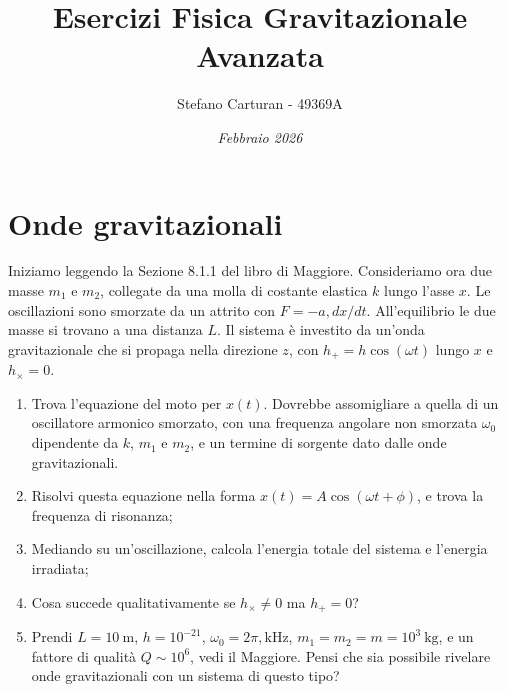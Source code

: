 \documentclass[a4paper,10pt]{article}
\begin{document}
\title{\textbf{Esercizi Fisica Gravitazionale Avanzata}}
\author{Stefano Carturan - 49369A}
\date{\textit{Febbraio 2026}}
\maketitle

\tableofcontents

\newpage

\section{Onde gravitazionali}

Iniziamo leggendo la Sezione 8.1.1 del libro di Maggiore.
Consideriamo ora due masse $m_1$ e $m_2$, collegate da una molla di costante elastica $k$ lungo l’asse $x$.
Le oscillazioni sono smorzate da un attrito con $F = -a , dx/dt$. All’equilibrio le due masse si trovano a una distanza $L$.
Il sistema è investito da un’onda gravitazionale che si propaga nella direzione $z$, con
$h_{+} = h \cos(\omega t)$ lungo $x$ e $h_{\times} = 0$.

\begin{enumerate}

    \item Trova l’equazione del moto per $x(t)$. Dovrebbe assomigliare a quella di un oscillatore armonico smorzato, con una frequenza angolare non smorzata $\omega_0$ dipendente da $k$, $m_1$ e $m_2$, e un termine di sorgente dato dalle onde gravitazionali.
    
    \item Risolvi questa equazione nella forma $x(t) = A \cos(\omega t + \phi)$, e trova la frequenza di risonanza;
    
    \item Mediando su un’oscillazione, calcola l’energia totale del sistema e l’energia irradiata;
    
    \item Cosa succede qualitativamente se $h_{\times} \neq 0$ ma $h_{+} = 0$?

    \item Prendi $L = 10 \ \mathrm{m}$, $h = 10^{-21}$, $\omega_0 = 2\pi,\mathrm{kHz}$, $m_1 = m_2 = m = 10^3 \ \mathrm{kg}$, e un fattore di qualità $Q \sim 10^6$, vedi il Maggiore.
    Pensi che sia possibile rivelare onde gravitazionali con un sistema di questo tipo?

\end{enumerate}
\end{document}
